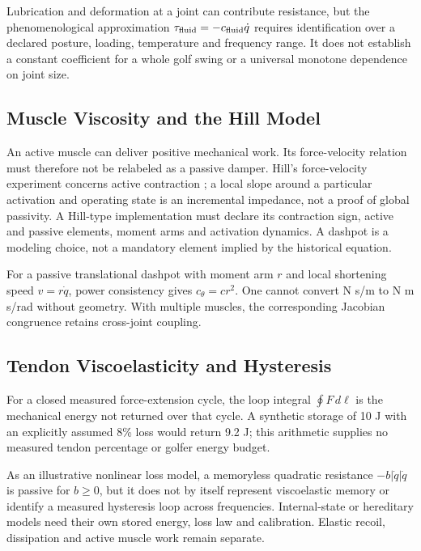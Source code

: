 Lubrication and deformation at a joint can contribute resistance, but the phenomenological approximation \(\tau_{\rm fluid}=-c_{\rm fluid}\dot q\) requires identification over a declared posture, loading, temperature and frequency range. It does not establish a constant coefficient for a whole golf swing or a universal monotone dependence on joint size.

\subsection{Muscle Viscosity and the Hill
Model}\label{muscle-viscosity-and-the-hill-model}

An active muscle can deliver positive mechanical work. Its force-velocity relation must therefore not be relabeled as a passive damper. Hill's force-velocity experiment concerns active contraction \citep{Hill1938}; a local slope around a particular activation and operating state is an incremental impedance, not a proof of global passivity. A Hill-type implementation must declare its contraction sign, active and passive elements, moment arms and activation dynamics. A dashpot is a modeling choice, not a mandatory element implied by the historical equation.

For a passive translational dashpot with moment arm \(r\) and local shortening speed \(v=r\dot q\), power consistency gives \(c_\theta=c r^2\). One cannot convert N s/m to N m s/rad without geometry. With multiple muscles, the corresponding Jacobian congruence retains cross-joint coupling.

\subsection{Tendon Viscoelasticity and
Hysteresis}\label{tendon-viscoelasticity-and-hysteresis}

For a closed measured force-extension cycle, the loop integral \(\oint F\,d\ell\) is the mechanical energy not returned over that cycle. A synthetic storage of 10 J with an explicitly assumed 8\% loss would return 9.2 J; this arithmetic supplies no measured tendon percentage or golfer energy budget.

As an illustrative nonlinear loss model, a memoryless quadratic resistance \(-b|\dot q|\dot q\) is passive for \(b\geq0\), but it does not by itself represent viscoelastic memory or identify a measured hysteresis loop across frequencies. Internal-state or hereditary models need their own stored energy, loss law and calibration. Elastic recoil, dissipation and active muscle work remain separate.


